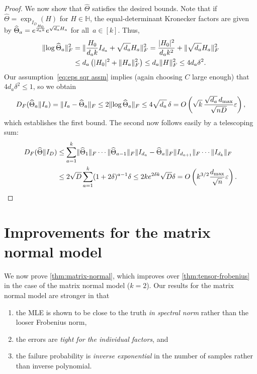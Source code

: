 \documentclass[aos]{imsart}
\theoremstyle{definition}
\numberwithin{equation}{section}
\DeclarePairedDelimiter{\abs}{\lvert}{\rvert}
\DeclarePairedDelimiter{\norm}{\lVert}{\rVert}
\renewcommand{\H}{{\mathbb{H}}}
\newcommand{\htheta}{\widehat{\Theta}}
\newcommand{\eps}{\varepsilon}
\begin{document}
\begin{proof}
We now show that $\htheta$ satisfies the desired bounds.
Note that if $\htheta = \exp_{I_D}(H)$ for $H \in \H$, the equal-determinant Kronecker factors are given by $\htheta_a = \smash{e^{\frac{H_0}{d_a k}} e^{\sqrt{d_a} H_a}}$ for all~$a\in[k]$.
Thus,
\begin{align*}
  \norm{\log \htheta_a}_F^2
&= \norm{\frac{H_0}{d_a k} I_{d_a} + \sqrt{d_a} H_a}_F^2
= \frac{\abs{H_0}^2}{d_a k^2} + \norm{\sqrt{d_a} H_a}_F^2 \\
&\leq d_a \left( \abs{H_0}^2 + \norm{H_a}_F^2 \right)
\leq d_a \norm H_F^2
\leq 4 d_a \delta^2.
\end{align*}
Our assumption~\eqref{eq:eps sqr assm} implies (again choosing $C$ large enough) that $4 d_a \delta^2 \leq 1$, so we obtain
\begin{align*}
  D_F(\htheta_a\Vert I_a)
= \norm{I_a - \htheta_a}_F
\leq 2 \norm{\log\htheta_a}_F
\leq 4 \sqrt{d_a} \, \delta
= O\left( \sqrt k \, \frac{\sqrt{d_a} \, d_{\max} }{\sqrt{nD}} \eps \right),
\end{align*}
which establishes the first bound.
The second now follows easily by a telescoping sum:
\begin{align*}
  D_F(\htheta\Vert I_D)
&\leq \sum_{a=1}^k \norm{\htheta_1}_F \cdots \norm{\htheta_{a-1}}_F \norm{I_{d_a} - \htheta_a}_F \norm{I_{d_{a+1}}}_F \cdots \norm{I_{d_k}}_F \\
&\leq 2 \sqrt{D} \sum_{a=1}^k (1 + 2\delta)^{a-1} \delta
\leq 2 k e^{2\delta k} \sqrt{D} \delta
= O\left( k^{3/2} \frac{d_{\max} }{\sqrt{n}} \eps \right).
\end{align*}
\end{proof}


\section{Improvements for the matrix normal model}\label{sec:matrix-normal}
We now prove \cref{thm:matrix-normal}, which improves over \cref{thm:tensor-frobenius} in the case of the matrix normal model ($k=2$).
Our results for the matrix normal model are stronger in that
\begin{enumerate}
\item the MLE is shown to be close to the truth \emph{in spectral norm} rather than the looser Frobenius norm,
\item the errors are \emph{tight for the individual factors}, and
\item the failure probability is \emph{inverse exponential} in the number of samples rather than inverse polynomial.
\end{enumerate}
\end{document}
